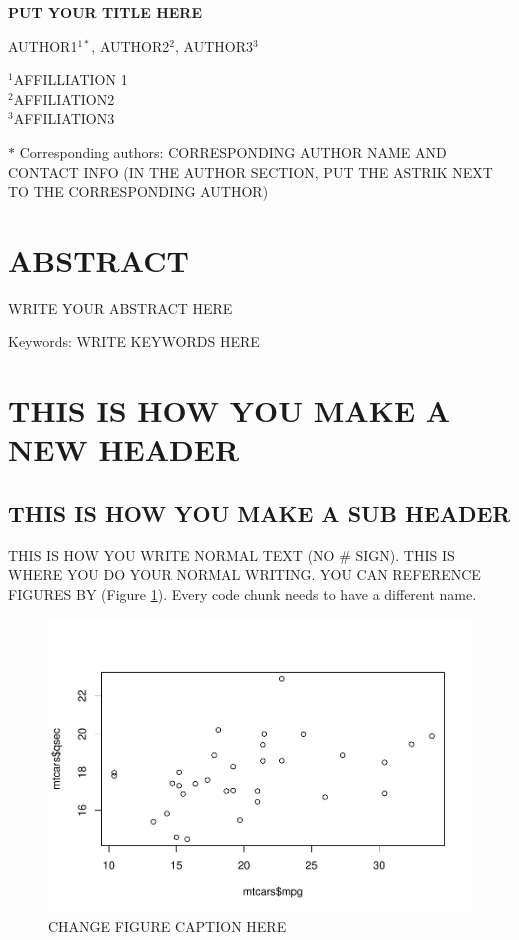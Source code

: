 \documentclass[
]{article}
\author{}
\date{\vspace{-2.5em}}
\begin{document}
\begin{center}
    
\textbf{\Large PUT YOUR TITLE HERE}
    
\textsc{AUTHOR1$^{1*}$, AUTHOR2$^{2}$, AUTHOR3$^{3}$}

\normalsize{\indent $^1$AFFILLIATION 1 \\ $^2$AFFILIATION2 \\ $^3$AFFILIATION3}

$\text{*}$ Corresponding authors: CORRESPONDING AUTHOR NAME AND CONTACT INFO (IN THE AUTHOR SECTION, PUT THE ASTRIK NEXT TO THE CORRESPONDING AUTHOR)
\end{center}

\newpage

\section{ABSTRACT}\label{abstract}

WRITE YOUR ABSTRACT HERE

Keywords: WRITE KEYWORDS HERE

\section{THIS IS HOW YOU MAKE A NEW HEADER}\label{this-is-how-you-make-a-new-header}

\subsection{THIS IS HOW YOU MAKE A SUB HEADER}\label{this-is-how-you-make-a-sub-header}

THIS IS HOW YOU WRITE NORMAL TEXT (NO \# SIGN). THIS IS WHERE YOU DO YOUR NORMAL WRITING. YOU CAN REFERENCE FIGURES BY (Figure \ref{fig:NAMECODECHUNK}). Every code chunk needs to have a different name.

\begin{figure}
\centering
\includegraphics{Testing_files/figure-latex/NAMECODECHUNK-1.pdf}
\caption{\label{fig:NAMECODECHUNK}CHANGE FIGURE CAPTION HERE}
\end{figure}
\end{document}
